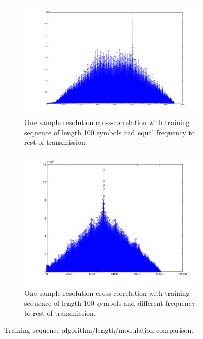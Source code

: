\documentclass[12pt,a4paper,openright]{report}
\begin{document}
\begin{figure}[H]
\begin{subfigure}[b]{0.5\linewidth}
    \label{fig7:b} 
    \vspace{4ex}
  \end{subfigure} 
  \quad
  \begin{subfigure}[b]{0.5\linewidth}
    \centering
    \includegraphics[width=1\linewidth]{100eq.png} 
    \caption{One sample resolution cross-correlation with training sequence of length 100 symbols and equal frequency to rest of transmission.} 
    \label{fig7:c} 
  \end{subfigure}%
  \quad
  \begin{subfigure}[b]{0.5\linewidth}
    \centering
    \includegraphics[width=1\linewidth]{100dif.png} 
    \caption{One sample resolution cross-correlation with training sequence of length 100 symbols and different frequency to rest of transmission.} 
    \label{fig7:d} 
  \end{subfigure} 
  \caption[Training sequence algorithm/length/modulation comparison]{Training sequence algorithm/length/modulation comparison.}
  \label{fig:tscomp} 
\end{figure}
\end{document}

